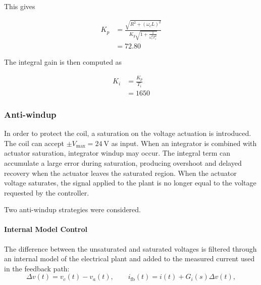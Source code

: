 This gives

\begin{equation}
\begin{aligned}
 K_p
& = 
    \frac{\sqrt{R^2+(\omega_c L)^2}}
    {K_g \sqrt{1+\frac{1}{\omega_c^2T_i^2}}} \\
& = 72.80            
\end{aligned} 
\end{equation}

The integral gain is then computed as

\begin{equation}
\begin{aligned}
    K_i 
&= \frac{K_p}{T_i} \\
& = 1650
\end{aligned}
\end{equation}

\subsubsection{Anti-windup}
In order to protect the coil, a saturation on the voltage actuation is introduced.
The coil can accept $\pm V_{\max} = 24\ \mathrm{V}$ as input.
When an integrator is combined with actuator saturation, integrator windup may occur.
The integral term can accumulate a large error during saturation, producing overshoot and delayed
recovery when the actuator leaves the saturated region.
When the actuator voltage saturates, the signal applied to the plant is no longer equal to the voltage requested by the controller. 

Two anti-windup strategies were considered.
\paragraph{Internal Model Control}
The difference between the unsaturated and saturated voltages is filtered through an internal model of the electrical plant and added to the measured current used in the feedback path:
\begin{equation}
    \Delta v(t) = v_c(t) - v_a(t),
    \qquad
    i_{\mathrm{fb}}(t) = i(t) + G_i(s)\Delta v(t),
\end{equation}


